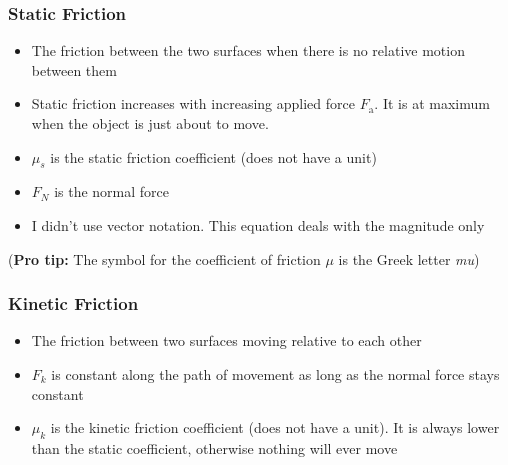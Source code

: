 \documentclass[12pt,compress,aspectratio=169]{beamer}
\newcommand{\eq}[2]{\vspace{#1}{\Large\begin{displaymath}#2\end{displaymath}}}
\begin{document}
\begin{frame}
  \frametitle{Static Friction}
  \begin{itemize}
  \item The friction between the two surfaces when there is no relative
    motion between them
  \item Static friction increases with increasing applied force
    $F_\mathrm{a}$. It is at maximum when the object is just about to move.
  \end{itemize}

  \eq{-.3in}{\boxed{\max F_s = \mu_sF_N}}

  \begin{itemize}
  \item $\mu_s$ is the static friction coefficient (does not have a unit)
  \item $F_N$ is the normal force
  \item I didn't use vector notation. This equation deals with the magnitude
    only
  \end{itemize}
  {\footnotesize (\textbf{Pro tip:} The symbol for the coefficient of friction
    $\mu$ is the Greek letter \emph{mu})}
\end{frame}

\begin{frame}
  \frametitle{Kinetic Friction}
  
  \eq{0pt}{\boxed{F_k = \mu_kF_N}}

  \begin{itemize}
  \item The friction between two surfaces moving relative to each other
  \item $F_k$ is constant along the path of movement as long
    as the normal force stays constant
  \item $\mu_k$ is the kinetic friction coefficient (does not have a unit). It
  is always lower than the static coefficient, otherwise nothing will ever move
    
    \eq{-.3in}{\mu_k\leq\mu_s}
  \end{itemize}
\end{frame}
\end{document}
